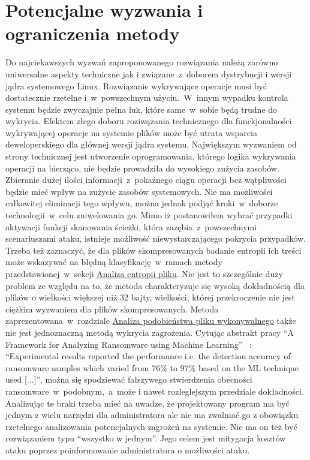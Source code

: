 \section{Potencjalne wyzwania i ograniczenia metody}
Do najciekawszych wyzwań zaproponowanego rozwiązania należą zarówno uniwersalne aspekty techniczne jak i związane~z~doborem dystrybucji i wersji jądra systemowego Linux. Rozwiązanie wykrywające operacje musi być dostatecznie rzetelne i~w~powszechnym użyciu.~W~innym wypadku kontrola systemu będzie zwyczajnie pełna luk, które same~w~sobie będą trudne do wykrycia. Efektem złego doboru roziwązania technicznego dla funckjonalności wykrywającej operacje na systemie plików może być utrata wsparcia deweloperskiego dla głównej wersji jądra systemu.
\newline
Największym wyzwaniem od strony technicznej jest utworzenie oprogramowania, którego logika wykrywania operacji na bierząco, nie będzie prowadziła do wysokiego zużycia zasobów. Zbieranie dużej ilości informacji~z~pokaźnego ciągu operacji bez wątpliwości będzie mieć wpływ na zużycie zasobów systemowych. Nie ma możliwości całkowitej eliminacji tego wpływu, można jednak podjąć kroki~w~doborze technologii~w~celu zniwelowania go. 
\newline
Mimo iż postanowiłem wybrać przypadki aktywacji funkcji skanowania ścieżki, która zazębia~z~powszechnymi scenariuszami ataku, istnieje możliwość niewystarczającego pokrycia przypadków. 
\newline
Trzeba też zaznaczyć, że dla plików skompresowanych badanie entropii ich treści może wskazywać na błędną klasyfikację~w~ramach metody przedstawionej~w~sekcji \hyperref[sec:entropia] {Analiza entropii pliku}. Nie jest to szczególnie duży problem ze względu na to, że metoda charakteryzuje się wysoką dokładnością dla plików o wielkości większej niż 32 bajty, wielkości, której przekroczenie nie jest ciężkim wyzwaniem dla plików skompresowanych. 
\newline
Metoda zaprezentowana~w~rozdziale \hyperref[sec:binaries] {Analiza podobieństwa pliku wykonywalnego} także nie jest jednoznaczną metodą wykrycia zagrożenia. Cytując abstrakt pracy \foreignquote{english}{A Framework for Analyzing Ransomware using
Machine Learning}~\cite{8628743} : \foreignquote{english}{Experimental results reported the performance
i.e. the detection accuracy of ransomware samples which varied
from 76\% to 97\% based on the ML technique used [...]}, można się spodziewać fałszywego stwierdzenia obecności ransomware~w~podobnym,~a~może i nawet rozleglejszym przedziale dokładności. 
\newline
Analizując te braki trzeba mieć na uwadze, że projektowany program ma być jednym z wielu narzędzi dla administratora ale nie ma zwalniać go z obowiązku rzetelnego analizowania potencjalnych zagrożeń na systemie. Nie ma on też być rozwiązaniem typu \enquote{wszystko w jednym}. Jego celem jest mitygacja kosztów ataku poprzez poinformowanie administratora o możliwości ataku.